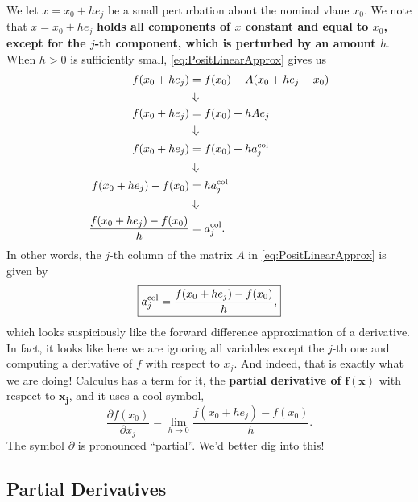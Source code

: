  We let $x=x_0 + h e_j$ be a small perturbation about the nominal vlaue $x_0$. We note that $x=x_0 + h e_j$ \textbf{holds all components of $x$ constant and equal to $x_0$, except for the $j$-th component, which is perturbed by an amount $h$}. When  $h>0$ is sufficiently small, \eqref{eq:PositLinearApprox} gives us 
  \begin{equation}
     \label{eq:PositLinearApprox02}
     \begin{aligned}
          f(x_0 + h e_j) &= f(x_0) + A ( x_0 + h e_j - x_0)\\
          &\Downarrow \\
          f(x_0 + h e_j) &= f(x_0) + h A e_j \\
           &\Downarrow \\
          f(x_0 + h e_j) &= f(x_0) + h a_j^{\rm col}\\
                &\Downarrow \\
          f(x_0 + h e_j) - f(x_0)  &=  h a_j^{\rm col}\\
                          &\Downarrow \\
          \frac{f(x_0 + h e_j) - f(x_0)}{h}  &=  a_j^{\rm col}.
     \end{aligned}
 \end{equation}
 In other words, the $j$-th column of the matrix $A$ in \eqref{eq:PositLinearApprox} is given by
   \begin{equation}
     \label{eq:PositLinearApprox03}
     \boxed{
  a_j^{\rm col}= \frac{f(x_0 + h e_j) - f(x_0)}{h}, }
 \end{equation}
 which looks suspiciously like the forward difference approximation of a derivative. In fact, it looks like here we are ignoring all variables except the $j$-th one and computing a derivative of $f$ with respect to $x_j$. And indeed, that is exactly what we are doing! Calculus has a term for it, the \textbf{partial derivative of} $\mathbf{f(x)}$ with respect to $\mathbf{x_j}$, and it uses a cool symbol,
    \begin{equation}
     \label{eq:PartialDerivative}
     \boxed{
\frac{\partial f(x_0)}{\partial x_j}= \lim_{h \to 0} \frac{f(x_0 + h e_j) - f(x_0)}{h}.}
 \end{equation}
 The symbol $\partial$ is pronounced ``partial''. We'd better dig into this!
 
  \vspace*{0.2cm}
 


 
 \subsection{Partial Derivatives}
 
